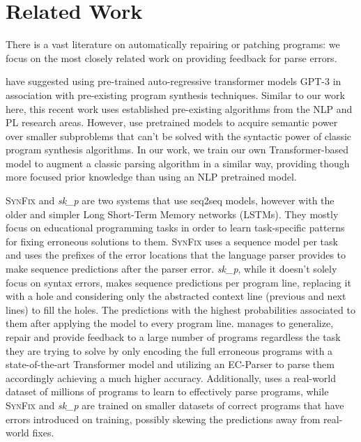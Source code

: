 \section{Related Work}
\label{sec:related-work}

There is a vast literature on automatically repairing or patching programs:
we focus on the most closely related work on providing feedback for parse
errors.


%
\citep{Rahmani2021, Verbruggen2021} have suggested using pre-trained
auto-regressive transformer models \ie \textsc{GPT-3} \citep{GPT2020} in
association with pre-existing program synthesis techniques. Similar to our work
here, this recent work uses established pre-existing algorithms from the NLP and
PL research areas. However, \citep{Rahmani2021, Verbruggen2021} use pretrained
models to acquire semantic power over smaller subproblems that can't be solved
with the syntactic power of classic program synthesis algorithms. In our work,
we train our own Transformer-based model to augment a classic parsing algorithm
in a similar way, providing though more focused prior knowledge than using an
NLP pretrained model.

%
\textsc{SynFix} \citep{Bhatia2016} and \emph{sk\_p} \citep{Pu2016} are two
systems that use seq2seq models, however with the older and simpler Long
Short-Term Memory networks (LSTMs). They mostly focus on educational programming
tasks in order to learn task-specific patterns for fixing erroneous solutions to
them. \textsc{SynFix} uses a sequence model per task and uses the prefixes of
the error locations that the language parser provides to make sequence
predictions after the parser error. \emph{sk\_p}, while it doesn't solely focus
on syntax errors, makes sequence predictions per program line, replacing it with
a hole and considering only the abstracted context line (previous and next
lines) to fill the holes. The predictions with the highest probabilities
associated to them after applying the model to every program line. \toolname
manages to generalize, repair and provide feedback to a large number of programs
regardless the task they are trying to solve by only encoding the full erroneous
programs with a state-of-the-art Transformer model and utilizing an EC-Parser to
parse them accordingly achieving a much higher accuracy. Additionally, uses a
real-world dataset of millions of \python programs to learn to effectively parse
programs, while \textsc{SynFix} and \emph{sk\_p} are trained on smaller datasets
of correct programs that have errors introduced on training, possibly skewing
the predictions away from real-world fixes.

